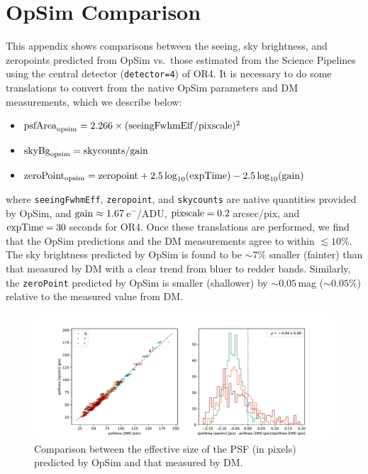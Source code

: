 \documentclass[DM,authoryear,toc]{lsstdoc}
\begin{document}
\appendix

\section{OpSim Comparison}
\label{app:opsim}

This appendix shows comparisons between the seeing, sky brightness, and zeropoints predicted from OpSim vs.\ those estimated from the Science Pipelines using the central detector (\texttt{detector=4}) of OR4. It is necessary to do some translations to convert from the native OpSim parameters and DM measurements, which we describe below:
\begin{itemize}
    \item ${\rm psfArea}_{\rm opsim} = 2.266 \times ({\rm seeingFwhmEff}/{\rm pixscale})^2$
    \item ${\rm skyBg}_{\rm opsim} = {\rm skycounts}/{\rm gain}$
    \item ${\rm zeroPoint}_{\rm opsim} = {\rm zeropoint} + 2.5 \log_{10}({\rm expTime}) - 2.5\log_{10}({\rm gain})$
\end{itemize}
where \texttt{seeingFwhmEff}, \texttt{zeropoint}, and \texttt{skycounts} are native quantities provided by OpSim, and ${\rm gain} \approx 1.67$\,e$^-$/ADU, ${\rm pixscale} = 0.2$\,arcsec/pix, and ${\rm expTime} = 30$\,seconds for OR4. Once these translations are performed, we find that the OpSim predictions and the DM measurements agree to within $\lesssim10\%$. The sky brightness predicted by OpSim is found to be $\sim 7\%$ smaller (fainter) than that measured by DM with a clear trend from bluer to redder bands. Similarly, the \texttt{zeroPoint} predicted by OpSim is smaller (shallower) by $\sim 0.05$\,mag ($\sim 0.05\%$) relative to the measured value from DM. 

\begin{figure}
    \includegraphics[width=\textwidth]{figures/or4_opsim_psf.pdf}
    \caption{\label{fig:opsim_psf} Comparison between the effective size of the PSF (in pixels) predicted by OpSim and that measured by DM.}
\end{figure}
\end{document}
